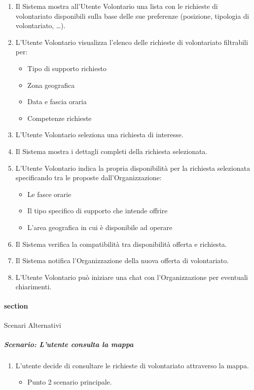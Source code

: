\begin{enumerate}
    \item Il Sistema mostra all'Utente Volontario una lista con le richieste di volontariato disponibili sulla base delle sue preferenze (posizione, tipologia di volontariato, …).
    \item L'Utente Volontario visualizza l'elenco delle richieste di volontariato filtrabili per:
    \begin{itemize}
        \item Tipo di supporto richiesto
        \item Zona geografica
        \item Data e fascia oraria
        \item Competenze richieste
    \end{itemize}
    \item L'Utente Volontario seleziona una richiesta di interesse.
    \item Il Sistema mostra i dettagli completi della richiesta selezionata.
    \item L'Utente Volontario indica la propria disponibilità per la richiesta selezionata specificando tra le proposte dall’Organizzazione:
    \begin{itemize}
        \item Le fasce orarie
        \item Il tipo specifico di supporto che intende offrire
        \item L'area geografica in cui è disponibile ad operare
    \end{itemize}
    \item Il Sistema verifica la compatibilità tra disponibilità offerta e richiesta.
    \item Il Sistema notifica l'Organizzazione della nuova offerta di volontariato.
    \item L'Utente Volontario può iniziare una chat con l'Organizzazione per eventuali chiarimenti.
\end{enumerate}

\paragraph{section}{Scenari Alternativi}

\subparagraph*{Scenario: L’utente consulta la mappa}
\begin{enumerate}
    \item L’utente decide di consultare le richieste di volontariato attraverso la mappa.
    \begin{itemize}
        \item Punto 2 scenario principale.
    \end{itemize}
\end{enumerate}

